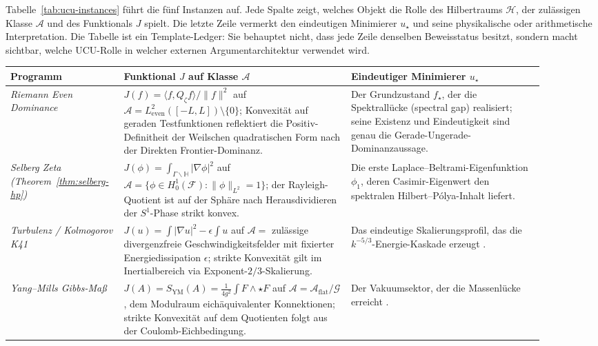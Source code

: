 \documentclass[11pt]{article}
\theoremstyle{definition}
\theoremstyle{remark}
\begin{document}
Tabelle~\ref{tab:ucu-instances} führt die fünf Instanzen auf.
Jede Spalte zeigt, welches Objekt die Rolle des Hilbertraums $\mathcal{H}$,
der zulässigen Klasse $\mathcal{A}$ und des Funktionals $J$ spielt. Die letzte Zeile
vermerkt den eindeutigen Minimierer $u_\star$ und seine physikalische oder arithmetische
Interpretation. Die Tabelle ist ein Template-Ledger: Sie behauptet nicht, dass
jede Zeile denselben Beweisstatus besitzt, sondern macht sichtbar, welche
UCU-Rolle in welcher externen Argumentarchitektur verwendet wird.

\renewcommand{\arraystretch}{1.25}
\begin{table}[htbp]
\centering
\scriptsize
\setlength{\tabcolsep}{3pt}
\begin{tabular}{|p{0.16\linewidth}|p{0.40\linewidth}|p{0.34\linewidth}|}
\hline
\textbf{Programm} & \textbf{Funktional $J$ auf Klasse $\mathcal{A}$} &
\textbf{Eindeutiger Minimierer $u_\star$} \\ \hline

\emph{Riemann Even Dominance} \cite{Geiger2026RHII}
& $J(f) = \langle f, Q_\zeta f \rangle / \|f\|^2$ auf
$\mathcal{A} = L^2_\mathrm{even}([-L,L]) \setminus \{0\}$;
Konvexität auf geraden Testfunktionen reflektiert die Positiv-Definitheit
der Weilschen quadratischen Form nach der Direkten Frontier-Dominanz.
& Der Grundzustand $f_\star$, der die Spektrallücke (spectral gap) realisiert;
seine Existenz und Eindeutigkeit sind genau die
Gerade-Ungerade-Dominanzaussage. \\ \hline

\emph{Selberg Zeta (Theorem~\ref{thm:selberg-hp})}
& $J(\phi) = \int_{\Gamma\backslash\mathbb{H}} |\nabla \phi|^2$
auf $\mathcal{A} = \{\phi \in H^1_0(\mathcal{F}) : \|\phi\|_{L^2}=1\}$;
der Rayleigh-Quotient ist auf der Sphäre nach Herausdividieren
der $S^1$-Phase strikt konvex.
& Die erste Laplace--Beltrami-Eigenfunktion $\phi_1$, deren
Casimir-Eigenwert den spektralen Hilbert--P\'olya-Inhalt liefert. \\ \hline

\emph{Turbulenz / Kolmogorov K41}
& $J(u) = \int |\nabla u|^2 - \epsilon \int u$ auf
$\mathcal{A} = $ zulässige divergenzfreie Geschwindigkeitsfelder mit
fixierter Energiedissipation $\epsilon$; strikte Konvexität gilt im
Inertialbereich via Exponent-$2/3$-Skalierung.
& Das eindeutige Skalierungsprofil, das die $k^{-5/3}$-Energie-Kaskade
erzeugt \cite{FSTTurbulence}. \\ \hline

\emph{Yang--Mills Gibbs-Maß}
& $J(A) = S_{\mathrm{YM}}(A) = \tfrac{1}{4g^2}\int F \wedge {\star F}$
auf $\mathcal{A} = \mathcal{A}_{\mathrm{flat}} / \mathcal{G}$, dem
Modulraum eichäquivalenter Konnektionen; strikte Konvexität auf
dem Quotienten folgt aus der Coulomb-Eichbedingung.
& Der Vakuumsektor, der die Massenlücke
erreicht \cite{FSTYangMills}. \\ \hline


\end{tabular}
\end{table}
\end{document}
